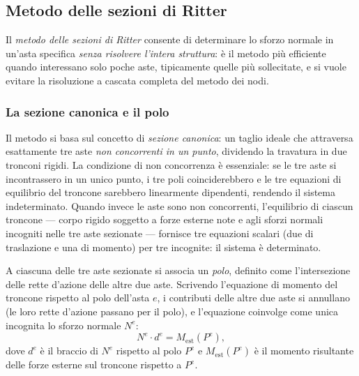 \subsection{Metodo delle sezioni di Ritter}
\label{sec:metodo_ritter}

Il \emph{metodo delle sezioni di Ritter} consente
di determinare lo sforzo normale in un'asta specifica
\emph{senza risolvere l'intera struttura}: è il metodo
più efficiente quando interessano solo poche aste,
tipicamente quelle più sollecitate, e si vuole evitare
la risoluzione a cascata completa del metodo dei nodi.

\subsubsection{La sezione canonica e il polo}
\label{subsec:sezione_canonica}

Il metodo si basa sul concetto di \emph{sezione
	canonica}: un taglio ideale che attraversa esattamente
tre aste \emph{non concorrenti in un punto},
dividendo la travatura in due tronconi rigidi.
La condizione di non concorrenza è essenziale:
se le tre aste si incontrassero in un unico punto,
i tre poli coinciderebbero e le tre equazioni di
equilibrio del troncone sarebbero linearmente
dipendenti, rendendo il sistema indeterminato.
Quando invece le aste sono non concorrenti,
l'equilibrio di ciascun troncone --- corpo rigido
soggetto a forze esterne note e agli sforzi normali
incogniti nelle tre aste sezionate --- fornisce
tre equazioni scalari (due di traslazione e una
di momento) per tre incognite: il sistema è
determinato.

A ciascuna delle tre aste sezionate si associa
un \emph{polo}, definito come l'intersezione delle
rette d'azione delle altre due aste. Scrivendo
l'equazione di momento del troncone rispetto al polo
dell'asta $e$, i contributi delle altre due aste
si annullano (le loro rette d'azione passano per il
polo), e l'equazione coinvolge come unica incognita
lo sforzo normale $N^e$:
\begin{equation}\label{eq:ritter_momento}
	N^e \cdot d^e = M_\text{est}(P^e),
\end{equation}
dove $d^e$ è il braccio di $N^e$ rispetto al polo
$P^e$ e $M_\text{est}(P^e)$ è il momento risultante
delle forze esterne sul troncone rispetto a $P^e$.



